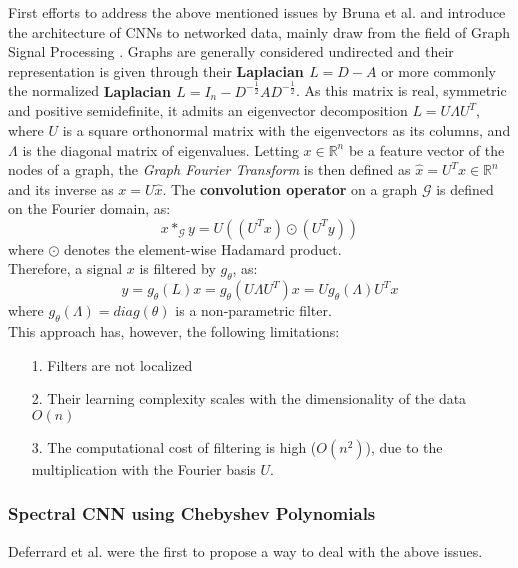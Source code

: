  First efforts to address the above mentioned issues
by Bruna et al. \cite{Lecun} and introduce the architecture of CNNs to networked data,
mainly draw from the field of Graph Signal Processing \cite{shuman}.
Graphs are generally considered undirected and their representation is given
through their \textbf{Laplacian $L = D -A$} or more commonly the normalized
\textbf{Laplacian $L = I_n - D^{-\frac{1}{2}}AD^{-\frac{1}{2}}$}. As this matrix
is real, symmetric and positive semidefinite, it admits an eigenvector
decomposition $L=U\Lambda U^T$, where $U$ is a square orthonormal matrix with
the eigenvectors as its columns, and $\Lambda$ is the diagonal matrix of eigenvalues.
Letting $x\in \mathbb{R}^{n}$ be a feature vector of the nodes of a graph,
the {\em Graph Fourier Transform} is then defined as $\hat{x}=U^T x \in \mathbb{R}^n$
and its inverse as $x = U\hat{x}$. The \textbf{convolution operator} on a graph
$\mathcal{G}$ is defined on the Fourier domain, as:
\begin{equation*}
x *_{\mathcal{G}} y = U((U^T x)\odot (U^T y))
\end{equation*}
where $\odot$ denotes the element-wise Hadamard product.\\
Therefore, a signal $x$ is filtered by $g_{\theta}$, as:\\
\begin{equation}
y = g_{\theta}(L)x = g_{\theta} (U\Lambda U^T)x = U g_{\theta}(\Lambda ) U^T x
\end{equation}
where $g_{\theta}(\Lambda) = diag(\theta)$ is a non-parametric filter.\\
This approach has, however, the following limitations:
\begin{itemize}
\item [1.] Filters are not localized
\item [2.] Their learning complexity scales with the dimensionality of the data $O(n)$
\item [3.] The computational cost of filtering is high ($O(n^2)$), due to the
multiplication with the Fourier basis $U$.
\end{itemize}

\subsubsection*{Spectral CNN using Chebyshev Polynomials}
Deferrard et al. \cite{defferard} were the first to propose a way to deal with
the above issues.\\

